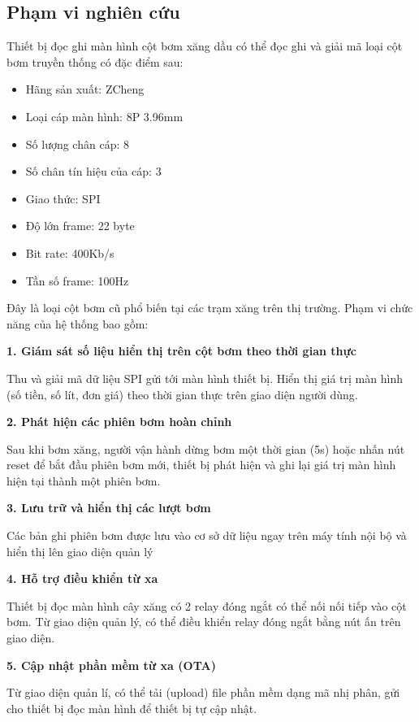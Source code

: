 \subsection{Phạm vi nghiên cứu}

\hspace{1cm} Thiết bị đọc ghi màn hình cột bơm xăng dầu có thể đọc ghi và giải mã loại cột bơm truyền thống có đặc điểm sau:
\begin{itemize}
   \item Hãng sản xuất: ZCheng
   \item Loại cáp màn hình: 8P 3.96mm
   \item Số lượng chân cáp: 8
   \item Số chân tín hiệu của cáp: 3
   \item Giao thức: SPI
   \item Độ lớn frame: 22 byte
   \item Bit rate: 400Kb/s
   \item Tần số frame: 100Hz
\end{itemize}
Đây là loại cột bơm cũ phổ biến tại các trạm xăng trên thị trường. Phạm vi chức năng của hệ thống bao gồm:

 \textbf{1. \quad Giám sát số liệu hiển thị trên cột bơm theo thời gian thực}

 Thu và giải mã dữ liệu SPI gửi tới màn hình thiết bị. Hiển thị giá trị màn hình (số tiền, số lít, đơn giá) theo thời gian thực trên giao diện người dùng.

  \textbf{
    2. \quad  Phát hiện các phiên bơm hoàn chỉnh
 }

 Sau khi bơm xăng, người vận hành dừng bơm một thời gian (5s) hoặc nhấn nút reset để bắt đầu phiên bơm mới, thiết bị phát hiện và ghi lại giá trị màn hình hiện tại thành một phiên bơm.

  \textbf{
    3. \quad Lưu trữ và hiển thị các lượt bơm
 }

 Các bản ghi phiên bơm được lưu vào cơ sở dữ liệu ngay trên máy tính nội bộ và hiển thị lên giao diện quản lý

 \textbf{
    4. \quad Hỗ trợ điều khiển từ xa
 }

Thiết bị đọc màn hình cây xăng có 2 relay đóng ngắt có thể nối nối tiếp vào cột bơm. Từ giao diện quản lý, có thể điều khiển relay đóng ngắt bằng nút ấn trên giao diện.


 \textbf{
    5. \quad Cập nhật phần mềm từ xa (OTA)
 }

 Từ giao diện quản lí, có thể tải (upload) file phần mềm dạng mã nhị phân, gửi cho thiết bị đọc màn hình để thiết bị tự cập nhật. 

